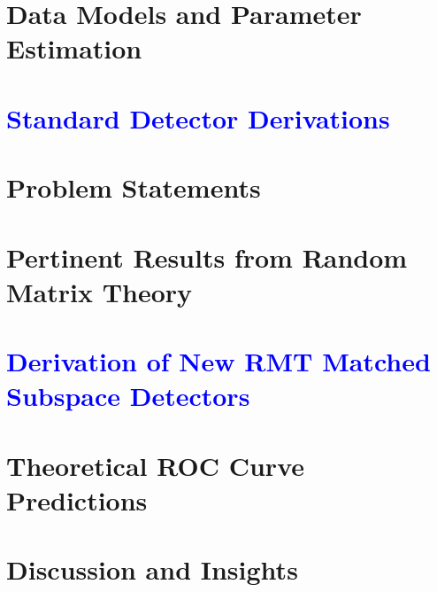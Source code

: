 \documentclass[10pt,twocolumn,twoside]{IEEEtran}
\begin{document}
\section{Data Models and Parameter Estimation}\label{sec:data_models}


\section{\textcolor{blue}{Standard Detector Derivations}}\label{sec:std_detecs}


\section{Problem Statements}\label{sec:prob_state}


\section{Pertinent Results from Random Matrix Theory}\label{sec:rmt}


\section{\textcolor{blue}{Derivation of New RMT Matched Subspace Detectors}}\label{sec:rmt_detecs}



%

\section{Theoretical ROC Curve Predictions}\label{sec:roc_theory}


\section{Discussion and Insights}\label{sec:results}

\end{document}
